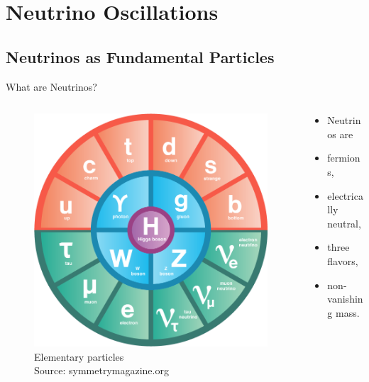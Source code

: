 \section{Neutrino Oscillations}

\subsection{Neutrinos as Fundamental Particles}

\begin{frame}{What are Neutrinos?}
  \begin{minipage}[\textheight]{\textwidth}
  \begin{columns}[T]

  \begin{column}{0.6\textwidth}
  \begin{figure}
  \includegraphics[width=0.9\linewidth,height=0.8\textheight,keepaspectratio]{assets/standard-model}
  \caption*{Elementary particles \\ Source: symmetrymagazine.org} %
  \end{figure}
  \end{column}

  \begin{column}{0.4\textwidth}


      \begin{itemize}
      \item[] Neutrinos are
      \item fermions,
      \item electrically neutral,
      \item three flavors,
      \item non-vanishing mass.
      \end{itemize}




\end{column}
\end{columns}
\end{minipage}
\end{frame}
